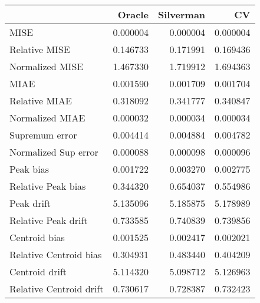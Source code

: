 \begin{tabular}{lrrr}
  \toprule
 & Oracle & Silverman & CV \\ 
  \midrule
MISE & 0.000004 & 0.000004 & 0.000004 \\ 
  Relative MISE & 0.146733 & 0.171991 & 0.169436 \\ 
  Normalized MISE & 1.467330 & 1.719912 & 1.694363 \\ 
  MIAE & 0.001590 & 0.001709 & 0.001704 \\ 
  Relative MIAE & 0.318092 & 0.341777 & 0.340847 \\ 
  Normalized MIAE & 0.000032 & 0.000034 & 0.000034 \\ 
  Supremum error & 0.004414 & 0.004884 & 0.004782 \\ 
  Normalized Sup error & 0.000088 & 0.000098 & 0.000096 \\ 
  Peak bias & 0.001722 & 0.003270 & 0.002775 \\ 
  Relative Peak bias & 0.344320 & 0.654037 & 0.554986 \\ 
  Peak drift & 5.135096 & 5.185875 & 5.178989 \\ 
  Relative Peak drift & 0.733585 & 0.740839 & 0.739856 \\ 
  Centroid bias & 0.001525 & 0.002417 & 0.002021 \\ 
  Relative Centroid bias & 0.304931 & 0.483440 & 0.404209 \\ 
  Centroid drift & 5.114320 & 5.098712 & 5.126963 \\ 
  Relative Centroid drift & 0.730617 & 0.728387 & 0.732423 \\ 
   \bottomrule
\end{tabular}
